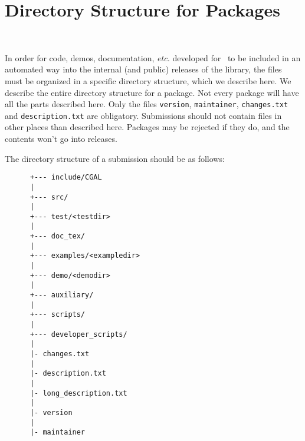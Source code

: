 
\chapter{Directory Structure for Packages}
\label{chap:directory_structure}
 \\

In order for code, demos, documentation, {\em etc.} developed for \cgal\ to 
be included in an automated way into the internal (and public) releases of the 
library, the files must be organized in a specific directory structure, which 
we describe here.  We describe the entire directory structure for a package. 
Not every package will have all the parts described here. Only the files
{\tt version}, {\tt maintainer}, {\tt changes.txt} and {\tt description.txt} 
are obligatory.
Submissions should not contain files in other places than described here.
Packages may be rejected if they do, and the contents won't go into releases.

The directory structure of a submission should be as follows: 

\begin{verbatim}
      +--- include/CGAL
      |
      +--- src/
      |
      +--- test/<testdir>
      |
      +--- doc_tex/
      |
      +--- examples/<exampledir>
      |
      +--- demo/<demodir>
      |
      +--- auxiliary/
      |
      +--- scripts/
      |
      +--- developer_scripts/
      |
      |- changes.txt
      |
      |- description.txt
      |
      |- long_description.txt
      |
      |- version
      |
      |- maintainer
\end{verbatim}


